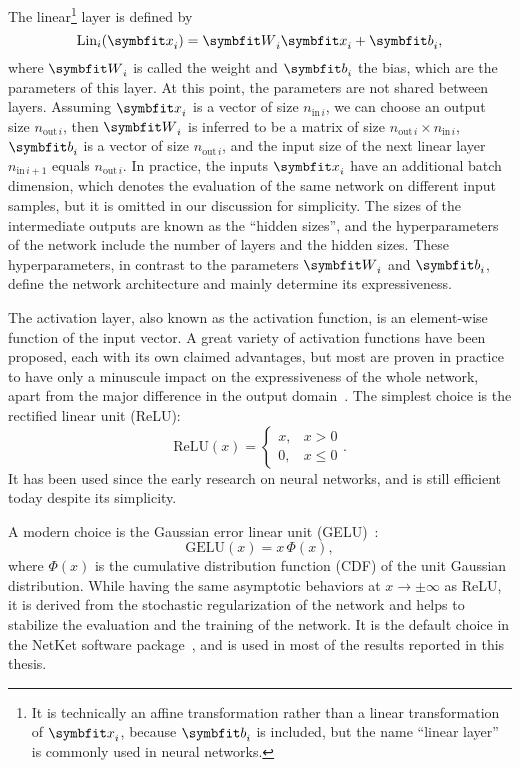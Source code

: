 The linear\footnote{It is technically an affine transformation rather than a linear transformation of $\vx_i$, because $\vb_i$ is included, but the name ``linear layer'' is commonly used in neural networks.} layer is defined by
\begin{equation}
\text{Lin}_i(\vx_i) = \mW_i \vx_i + \vb_i,
\label{eq:linear-layer}
\end{equation}
where $\mW_i$ is called the weight and $\vb_i$ the bias, which are the parameters of this layer. At this point, the parameters are not shared between layers. Assuming $\vx_i$ is a vector of size $n_{\text{in}\,i}$, we can choose an output size $n_{\text{out}\,i}$, then $\mW_i$ is inferred to be a matrix of size $n_{\text{out}\,i} \times n_{\text{in}\,i}$, $\vb_i$ is a vector of size $n_{\text{out}\,i}$, and the input size of the next linear layer $n_{\text{in}\,i + 1}$ equals $n_{\text{out}\,i}$.
In practice, the inputs $\vx_i$ have an additional batch dimension, which denotes the evaluation of the same network on different input samples, but it is omitted in our discussion for simplicity. The sizes of the intermediate outputs are known as the ``hidden sizes'', and the hyperparameters of the network include the number of layers and the hidden sizes. These hyperparameters, in contrast to the parameters $\mW_i$ and $\vb_i$, define the network architecture and mainly determine its expressiveness.

The activation layer, also known as the activation function, is an element-wise function of the input vector. A great variety of activation functions have been proposed, each with its own claimed advantages, but most are proven in practice to have only a minuscule impact on the expressiveness of the whole network, apart from the major difference in the output domain~\cite{kunc2024three}. The simplest choice is the rectified linear unit (ReLU):
\begin{equation}
\text{ReLU}(x) = \begin{cases}
x, & x > 0 \\
0, & x \le 0
\end{cases}.
\end{equation}
It has been used since the early research on neural networks, and is still efficient today despite its simplicity.

A modern choice is the Gaussian error linear unit (GELU)~\cite{hendrycks2016gaussian}:
\begin{equation}
\text{GELU}(x) = x\,\Phi(x),
\end{equation}
where $\Phi(x)$ is the cumulative distribution function (CDF) of the unit Gaussian distribution. While having the same asymptotic behaviors at $x \to \pm \infty$ as ReLU, it is derived from the stochastic regularization of the network and helps to stabilize the evaluation and the training of the network. It is the default choice in the NetKet software package~\cite{carleo2019netket, vicentini2022netket}, and is used in most of the results reported in this thesis.

